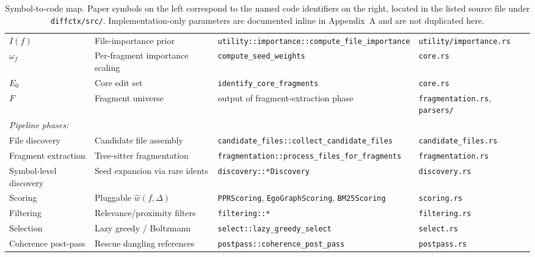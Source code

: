 \documentclass[11pt, a4paper]{article}
\begin{document}
\begin{table}[h]
{\begin{tabular}{lp{4.5cm}p{7cm}p{4.2cm}}
$I(f)$              & File-importance prior          & \texttt{utility::importance::compute\_file\_importance} & \texttt{utility/importance.rs} \\
$\omega_f$          & Per-fragment importance scaling & \texttt{compute\_seed\_weights}               & \texttt{core.rs} \\
$E_0$               & Core edit set                  & \texttt{identify\_core\_fragments}             & \texttt{core.rs} \\
$F$                 & Fragment universe              & output of fragment-extraction phase            & \texttt{fragmentation.rs}, \texttt{parsers/} \\
\midrule
\multicolumn{4}{l}{\emph{Pipeline phases:}} \\
File discovery      & Candidate file assembly        & \texttt{candidate\_files::collect\_candidate\_files} & \texttt{candidate\_files.rs} \\
Fragment extraction & Tree-sitter fragmentation      & \texttt{fragmentation::process\_files\_for\_fragments} & \texttt{fragmentation.rs} \\
Symbol-level discovery & Seed expansion via rare idents & \texttt{discovery::*Discovery}              & \texttt{discovery.rs} \\
Scoring             & Pluggable $\hat{w}(f, \Delta)$ & \texttt{PPRScoring}, \texttt{EgoGraphScoring}, \texttt{BM25Scoring} & \texttt{scoring.rs} \\
Filtering           & Relevance/proximity filters    & \texttt{filtering::*}                          & \texttt{filtering.rs} \\
Selection           & Lazy greedy / Boltzmann        & \texttt{select::lazy\_greedy\_select}          & \texttt{select.rs} \\
Coherence post-pass & Rescue dangling references     & \texttt{postpass::coherence\_post\_pass}       & \texttt{postpass.rs} \\
\bottomrule
\end{tabular}}
\caption{Symbol-to-code map. Paper symbols on the left correspond to the named code identifiers on the right, located in the listed source file under \texttt{diffctx/src/}. Implementation-only parameters are documented inline in Appendix~A and are not duplicated here.}
\label{tab:symbol-map}
\end{table}



\end{document}
